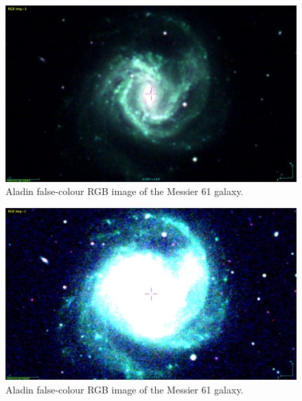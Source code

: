 \documentclass[12pt]{article}
\begin{document}
\begin{multicols}{2}
\begin{figure}[H]
\centering
\includegraphics[scale=0.22]{Images/As_Images/M61RGB.png}
\caption{Aladin false-colour RGB image of the Messier 61 galaxy.}
\label{RGB Aladin image of the Messier 61 galaxy}
\end{figure}

\begin{figure}[H]
\centering
\includegraphics[scale=0.22]{Images/As_Images/M61RGB2.png}
\caption{Aladin false-colour RGB image of the Messier 61 galaxy.}
\label{RGB2 Aladin image of the Messier 61 galaxy}
\end{figure}
\end{multicols}
\end{document}
